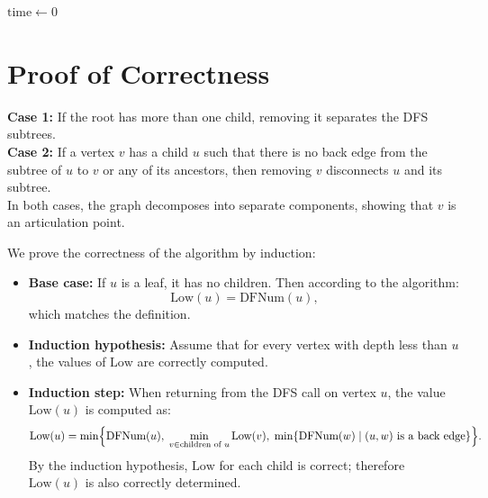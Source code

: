 \documentclass[a4paper,12pt]{article}
\newcommand{\EN}[1]{\text{#1}}
\begin{document}
	\begin{algorithm}[H]
		\caption{Computing \(\text{DFNum}\) and \(\text{Low}\) Using DFS}
		\(\text{time} \gets 0\)\;
		\BlankLine
		\BlankLine
		\;
	\end{algorithm}
	
	\newpage
	\section{Proof of Correctness}
	
	\textbf{Case 1:} If the root has more than one child, removing it separates the DFS subtrees.\\[1ex]
	
	\textbf{Case 2:} If a vertex \(v\) has a child \(u\) such that there is no back edge from the subtree of \(u\) to \(v\) or any of its ancestors, then removing \(v\) disconnects \(u\) and its subtree.\\[1ex]
	
	In both cases, the graph decomposes into separate components, showing that \(v\) is an articulation point.
	
	We prove the correctness of the algorithm by induction:
	
	\begin{itemize}
		\item \textbf{Base case:} If \(u\) is a leaf, it has no children. Then according to the algorithm:
		\[
		\EN{Low}(u) = \EN{DFNum}(u),
		\]
		which matches the definition.
		
		\item \textbf{Induction hypothesis:} Assume that for every vertex with depth less than \(u\), the values of \(\EN{Low}\) are correctly computed.
		
		\item \textbf{Induction step:} When returning from the DFS call on vertex \(u\), the value \(\EN{Low}(u)\) is computed as:
		\[
		\EN{Low}(u) = \min\Bigl\{
		\EN{DFNum}(u),\;
		\min_{v\in\text{children of } u}\EN{Low}(v),\;
		\min\{\EN{DFNum}(w)\mid (u,w) \text{ is a back edge}\}
		\Bigr\}.
		\]
		By the induction hypothesis, \(\EN{Low}\) for each child is correct; therefore \(\EN{Low}(u)\) is also correctly determined.
	\end{itemize}
	
\end{document}
